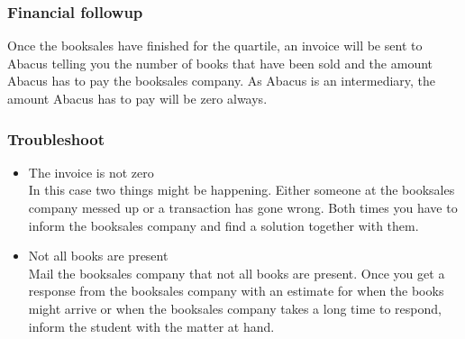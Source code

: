 \documentclass{article}
\begin{document}
\subsubsection*{Financial followup}
Once the booksales have finished for the quartile, an invoice will be sent to Abacus telling you the number of books that have been sold and the amount Abacus has to pay the booksales company. As Abacus is an intermediary, the amount Abacus has to pay will be zero always.  

\subsubsection*{Troubleshoot}
\begin{itemize} 
\vspace{-1mm}
\itemsep-1mm 
\item The invoice is not zero\\
In this case two things might be happening. Either someone at the booksales company messed up or a transaction has gone wrong. Both times you have to inform the booksales company and find a solution together with them.
\item Not all books are present\\
Mail the booksales company that not all books are present. Once you get a response from the booksales company with an estimate for when the books might arrive or when the booksales company takes a long time to respond, inform the student with the matter at hand.   
\end{itemize}
\end{document}
